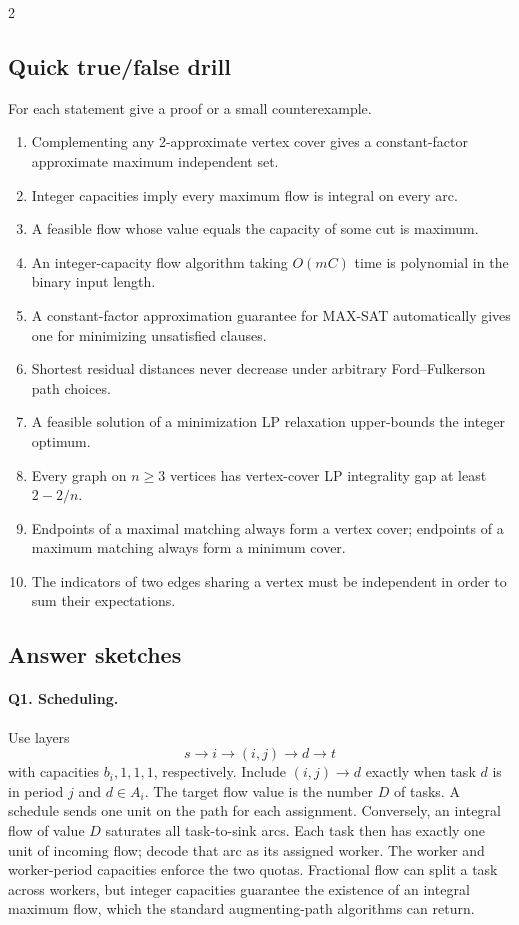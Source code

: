 \documentclass[10pt]{article}
\theoremstyle{definition}
\begin{document}
\begin{multicols*}{2}
\subsection{Quick true/false drill}
For each statement give a proof or a small counterexample.
\begin{enumerate}[label=\textbf{T\arabic*.}]
  \item Complementing any 2-approximate vertex cover gives a constant-factor
        approximate maximum independent set.
  \item Integer capacities imply every maximum flow is integral on every arc.
  \item A feasible flow whose value equals the capacity of some cut is maximum.
  \item An integer-capacity flow algorithm taking $O(mC)$ time is polynomial
        in the binary input length.
  \item A constant-factor approximation guarantee for MAX-SAT automatically
        gives one for minimizing unsatisfied clauses.
  \item Shortest residual distances never decrease under arbitrary
        Ford--Fulkerson path choices.
  \item A feasible solution of a minimization LP relaxation upper-bounds
        the integer optimum.
  \item Every graph on $n\ge3$ vertices has vertex-cover LP integrality gap
        at least $2-2/n$.
  \item Endpoints of a maximal matching always form a vertex cover;
        endpoints of a maximum matching always form a minimum cover.
  \item The indicators of two edges sharing a vertex must be independent
        in order to sum their expectations.
\end{enumerate}

\clearpage
\subsection{Answer sketches}
\paragraph{Q1. Scheduling.}
Use layers
\[
s\longrightarrow i\longrightarrow(i,j)\longrightarrow d\longrightarrow t
\]
with capacities $b_i,1,1,1$, respectively.  Include $(i,j)\to d$ exactly
when task $d$ is in period $j$ and $d\in A_i$.  The target flow value is
the number $D$ of tasks.  A schedule sends one unit on the path for each
assignment.  Conversely, an integral flow of value $D$ saturates all
task-to-sink arcs.  Each task then has exactly one unit of incoming flow;
decode that arc as its assigned worker.  The worker and worker-period
capacities enforce the two quotas.  Fractional flow can split a task across
workers, but integer capacities guarantee the existence of an integral
maximum flow, which the standard augmenting-path algorithms can return.


\end{multicols*}
\end{document}
